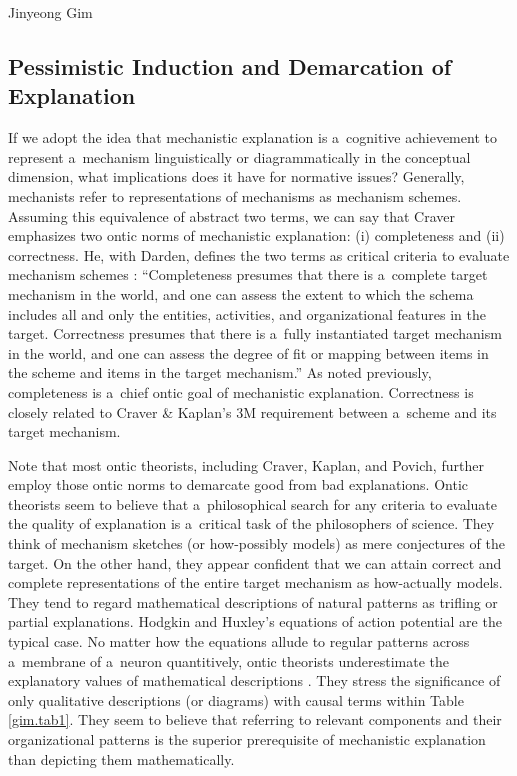 \begin{artengenv}{Jinyeong Gim}
\subsection{Pessimistic Induction and Demarcation of Explanation}

If we adopt the idea that mechanistic explanation is a~cognitive achievement to represent a~mechanism linguistically or diagrammatically in the conceptual dimension, what implications does it have for normative issues? Generally, mechanists refer to representations of mechanisms as mechanism schemes. Assuming this equivalence of abstract two terms, we can say that Craver emphasizes two ontic norms of mechanistic explanation: (i) completeness and (ii) correctness. He, with Darden, defines the two terms as critical criteria to evaluate mechanism schemes
\parencite[][p.9]{craver_search_2013}: %
 ``Completeness presumes that there is a~complete target mechanism in the world, and one can assess the extent to which the schema includes all and only the entities, activities, and organizational features in the target. Correctness presumes that there is a~fully instantiated target mechanism in the world, and one can assess the degree of fit or mapping between items in the scheme and items in the target mechanism.'' As noted previously, completeness is a~chief ontic goal of mechanistic explanation. Correctness is closely related to Craver \& Kaplan's 3M requirement between a~scheme and its target mechanism.

Note that most ontic theorists, including Craver, Kaplan, and Povich, further employ those ontic norms to demarcate good from bad explanations. Ontic theorists seem to believe that a~philosophical search for any criteria to evaluate the quality of explanation is a~critical task of the philosophers of science. They think of mechanism sketches (or how-possibly models) as mere conjectures of the target. On the other hand, they appear confident that we can attain correct and complete representations of the entire target mechanism as how-actually models. They tend to regard mathematical descriptions of natural patterns as trifling or partial explanations. Hodgkin and Huxley's equations of action potential are the typical case. No matter how the equations allude to regular patterns across a~membrane of a~neuron quantitively, ontic theorists underestimate the explanatory values of mathematical descriptions
\parencite[see][]{craver_explaining_2007}. %
 They stress the significance of only qualitative descriptions (or diagrams) with causal terms within Table \ref{gim.tab1}. They seem to believe that referring to relevant components and their organizational patterns is the superior prerequisite of mechanistic explanation than depicting them mathematically.


\end{artengenv}
